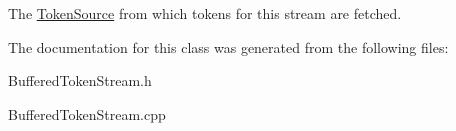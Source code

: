 The \hyperlink{classantlr4_1_1TokenSource}{Token\+Source} from which tokens for this stream are fetched. 

The documentation for this class was generated from the following files\+:\begin{DoxyCompactItemize}
\item 
Buffered\+Token\+Stream.\+h\item 
Buffered\+Token\+Stream.\+cpp\end{DoxyCompactItemize}
